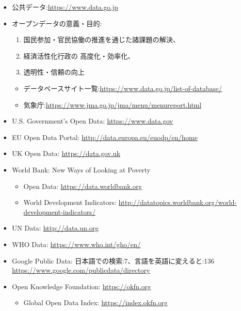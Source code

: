 \documentclass[
]{book}
\providecommand{\tightlist}{%
  \setlength{\itemsep}{0pt}\setlength{\parskip}{0pt}}
\theoremstyle{definition}
\theoremstyle{definition}
\theoremstyle{definition}
\theoremstyle{definition}
\theoremstyle{remark}
\begin{document}
\begin{itemize}
\item
  公共データ:\url{https://www.data.go.jp}
\item
  オープンデータの意義・目的:

  \begin{enumerate}
  \def\labelenumi{\arabic{enumi}.}
  \tightlist
  \item
    国民参加・官民協働の推進を通じた諸課題の解決、
  \item
    経済活性化行政の 高度化・効率化、
  \item
    透明性・信頼の向上
  \end{enumerate}

  \begin{itemize}
  \tightlist
  \item
    データベースサイト一覧:\url{https://www.data.go.jp/list-of-database/}\\
  \item
    気象庁:\url{https://www.jma.go.jp/jma/menu/menureport.html}
  \end{itemize}
\item
  U.S. Government's Open Data: \url{https://www.data.gov}
\item
  EU Open Data Portal: \url{http://data.europa.eu/euodp/en/home}
\item
  UK Open Data: \url{https://data.gov.uk}
\item
  World Bank: New Ways of Looking at Poverty

  \begin{itemize}
  \tightlist
  \item
    Open Data: \url{https://data.worldbank.org}
  \item
    World Development Indicators: \url{http://datatopics.worldbank.org/world-development-indicators/}
  \end{itemize}
\item
  UN Data: \url{http://data.un.org}
\item
  WHO Data: \url{https://www.who.int/gho/en/}
\item
  Google Public Data: 日本語での検索:7、言語を英語に変えると:136 \url{https://www.google.com/publicdata/directory}
\item
  Open Knowledge Foundation: \url{https://okfn.org}

  \begin{itemize}
  \tightlist
  \item
    Global Open Data Index: \url{https://index.okfn.org}
  \end{itemize}
\end{itemize}
\end{document}
